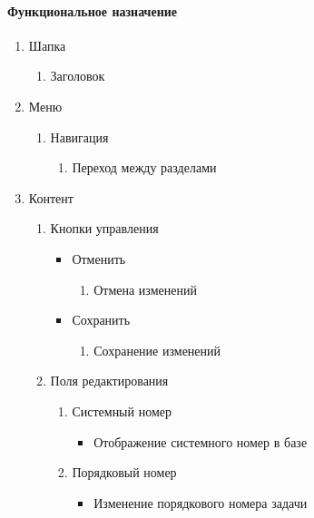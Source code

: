 \paragraph{Функциональное назначение}
\begin{enumerate}
    \item Шапка
    \begin{enumerate}
        \item Заголовок
    \end{enumerate}

    \item Меню
    \begin{enumerate}
        \item Навигация
        \begin{enumerate}
            \item Переход между разделами
        \end{enumerate}
    \end{enumerate}

    \item Контент
    \begin{enumerate}
        \item Кнопки управления
        \begin{itemize}
            \item Отменить
            \begin{enumerate}
                \item Отмена изменений
            \end{enumerate}

            \item Сохранить
            \begin{enumerate}
                \item Сохранение изменений
            \end{enumerate}
        \end{itemize}

        \item Поля редактирования
        \begin{enumerate}
            \item Системный номер
            \begin{itemize}
                \item Отображение системного номер в базе
            \end{itemize}

            \item Порядковый номер
            \begin{itemize}
                \item Изменение порядкового номера задачи
            \end{itemize}


\end{enumerate}
\end{enumerate}
\end{enumerate}
